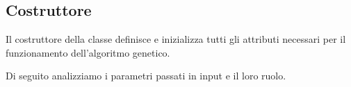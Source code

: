 \subsection{Costruttore}
Il costruttore della classe definisce e inizializza tutti gli attributi necessari per il funzionamento dell'algoritmo genetico.


Di seguito analizziamo i parametri passati in input e il loro ruolo.

